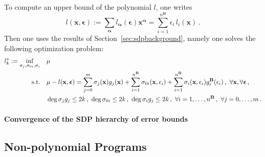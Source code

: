 \documentclass[preprint]{sigplanconf}
\newcommand{\x}{\mathbf{x}}
\newcommand{\alphab}{\boldsymbol{\alpha}}
\newcommand{\epsilonb}{\boldsymbol{\epsilon}}
\def\B{\mathbf{B}}
\theoremstyle{plain}
\begin{document}
To compute an upper bound of the polynomial $l$, one writes
\[ 
l(\x,\epsilonb):= \sum_{\alphab} l_{\alphab}(\epsilonb) \x^{\alphab} = \sum_{i=1}^{n^\B} \epsilon_i \, l_i(\x) \,.
\]
Then one uses the results of Section~\ref{sec:sdpbackground}, namely one solves the following optimization problem:
%
\begin{align}
\label{eq:primalexists}
l^*_k := \inf\limits_{\sigma_j, \sigma_{0 i}, \sigma_{i}} \quad & \mu \\			
\text{s.t.} \quad & \mu - l(\x, \epsilonb) = 
\sum_{j=0}^m \sigma_j(\x) g_j(\x) + 
\sum_{i=1}^{n^{\B}}\sigma_{0 i}(\x,\epsilon_i) +  \sum_{i=1}^{n^{\B}}\sigma_i(\x,\epsilon_i) g_i^{\B}(\epsilon_i)  \,, \
\forall \x, \forall \epsilonb \,, \notag\\
\quad & 
\deg \sigma_j g_j \leq 2 k \,, \ 
\deg \sigma_{0 i} \leq 2 k \,, \ 
\deg \sigma_i g_j \leq 2 k \,, \ 
\forall i = 1,\dots,n^{\B} \,, \ 
\forall j = 0,\dots,m \,. \notag
\end{align}

\paragraph{Convergence of the SDP hierarchy of error bounds}

\subsection{Non-polynomial Programs}
\end{document}
